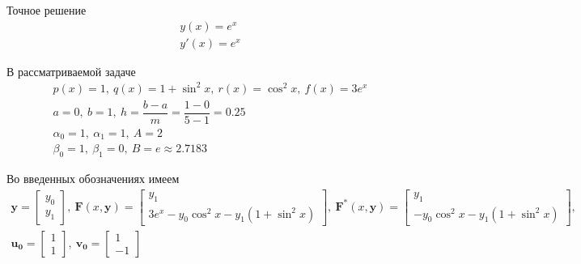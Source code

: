 \documentclass[a4paper, 12pt]{article}
\begin{document}
	Точное решение
	\begin{equation*}
		\begin{gathered}
			y(x)=e^x\\
			y'(x)=e^x
		\end{gathered}
	\end{equation*}
	
	В рассматриваемой задаче
	\begin{equation*}
		\begin{gathered}
			p(x)=1,\ q(x)=1+\sin^2x, \ r(x)=\cos^2x, \ f(x) = 3e^x\\
			a = 0,\ b = 1,\ h=\dfrac{b-a}{m}=\dfrac{1-0}{5-1}=0.25\\
			\alpha_0=1,\ \alpha_1=1,\ A=2\\
			\beta_0=1,\ \beta_1=0,\ B=e\approx2.7183
		\end{gathered}
	\end{equation*}

	Во введенных обозначениях имеем
	\begin{equation*}
		\begin{gathered}
		\mathbf{y}=
		\begin{bmatrix}
			y_0\\
			y_1
		\end{bmatrix}, \ 
		\mathbf{F}(x, \mathbf{y})=
		\begin{bmatrix}
			y_1\\
			3e^x-y_0\cos^2x-y_1(1+\sin^2x)
		\end{bmatrix}, \
		\mathbf{F^*}(x, \mathbf{y})=
		\begin{bmatrix}
			y_1\\
			-y_0\cos^2x-y_1(1+\sin^2x)
		\end{bmatrix}, \\
		\mathbf{u_0}=
		\begin{bmatrix}
			1\\
			1
		\end{bmatrix}, \
		\mathbf{v_0}=
		\begin{bmatrix}
			1\\
			-1
		\end{bmatrix}
		\end{gathered}
	\end{equation*}
	
\end{document}

